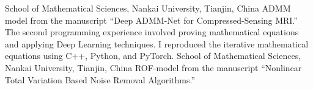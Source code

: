 \documentclass[11pt,a4paper, final]{moderncv}
\begin{document}
	{}{}{School of Mathematical Sciences, Nankai University, Tianjin, China}
	{ADMM model from the manuscript “Deep ADMM-Net for Compressed-Sensing MRI.”}
	{The second programming experience involved proving mathematical equations and applying Deep Learning techniques. 
	I reproduced the iterative mathematical equations using C++, Python, and PyTorch.}
	{}{}{School of Mathematical Sciences, Nankai University, Tianjin, China}
	{ROF-model from the manuscript “Nonlinear Total Variation Based Noise Removal Algorithms.”}
\end{document}
